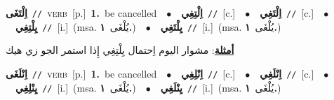 \documentclass[10pt,a4paper,twoside]{article} %
\begin{document}
\begin{multicols}{2}
{\setlength\topsep{0pt}\textbf{\foreignlanguage{arabic}{اِلْتَغَى}}\ {\color{gray}\texttt{//}\color{black}}\ \textsc{verb}\ [p.]\ \textbf{1.}~be cancelled\ \ $\bullet$\ \ \setlength\topsep{0pt}\textbf{\foreignlanguage{arabic}{اِلْتِغِي}}\ {\color{gray}\texttt{//}\color{black}}\ [c.]\ \ $\bullet$\ \ \setlength\topsep{0pt}\textbf{\foreignlanguage{arabic}{اِلْتَغِي}}\ {\color{gray}\texttt{//}\color{black}}\ [c.]\ \ $\bullet$\ \ \setlength\topsep{0pt}\textbf{\foreignlanguage{arabic}{يِلْتِغِي}}\ {\color{gray}\texttt{//}\color{black}}\ [i.]\ \color{gray}(msa. \foreignlanguage{arabic}{يُلْغَى}~\foreignlanguage{arabic}{\textbf{١.}})\color{black}\ \ $\bullet$\ \ \setlength\topsep{0pt}\textbf{\foreignlanguage{arabic}{يِلْتَغِي}}\ {\color{gray}\texttt{//}\color{black}}\ [i.]\ \color{gray}(msa. \foreignlanguage{arabic}{يُلْغَى}~\foreignlanguage{arabic}{\textbf{١.}})\color{black}\  \begin{flushright}\color{gray}\foreignlanguage{arabic}{\textbf{\underline{\foreignlanguage{arabic}{أمثلة}}}: مشوار اليوم اِحتمال يِلْتِغِي إِذا استمر الجو زي هيك}\end{flushright}\color{black}} \vspace{2mm}

{\setlength\topsep{0pt}\textbf{\foreignlanguage{arabic}{اِنْلَغَى}}\ {\color{gray}\texttt{//}\color{black}}\ \textsc{verb}\ [p.]\ \textbf{1.}~be cancelled\ \ $\bullet$\ \ \setlength\topsep{0pt}\textbf{\foreignlanguage{arabic}{اِنْلِغِي}}\ {\color{gray}\texttt{//}\color{black}}\ [c.]\ \ $\bullet$\ \ \setlength\topsep{0pt}\textbf{\foreignlanguage{arabic}{اِنْلَغِي}}\ {\color{gray}\texttt{//}\color{black}}\ [c.]\ \ $\bullet$\ \ \setlength\topsep{0pt}\textbf{\foreignlanguage{arabic}{يِنْلِغِي}}\ {\color{gray}\texttt{//}\color{black}}\ [i.]\ \color{gray}(msa. \foreignlanguage{arabic}{يُلْغَى}~\foreignlanguage{arabic}{\textbf{١.}})\color{black}\ \ $\bullet$\ \ \setlength\topsep{0pt}\textbf{\foreignlanguage{arabic}{يِنْلَغِي}}\ {\color{gray}\texttt{//}\color{black}}\ [i.]\ \color{gray}(msa. \foreignlanguage{arabic}{يُلْغَى}~\foreignlanguage{arabic}{\textbf{١.}})\color{black}\ } \vspace{2mm}


\end{multicols}
\end{document}
